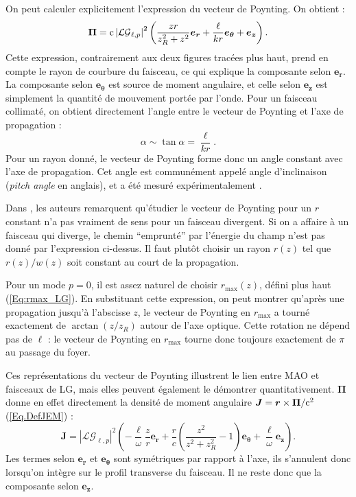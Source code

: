 On peut calculer explicitement l'expression du vecteur de Poynting. On obtient  :
\begin{equation}
\bm{\Pi} = \mathrm{c}\left|\mathcal{LG}_{\ell,p}\right|^2\left(\frac{zr}{z_R^2+z^2}\bm{e_r}+\frac{\ell}{kr}\bm{e_\theta}+\bm{e_z}\right).
\end{equation}
Cette expression, contrairement aux deux figures tracées plus haut, prend en compte le rayon de courbure du faisceau, ce qui explique la composante selon $\bm{e_r}$. La composante selon $\bm{e_\theta}$ est source de moment angulaire, et celle selon $\bm{e_z}$ est simplement la quantité de mouvement portée par l'onde. Pour un faisceau collimaté, on obtient directement l'angle entre le vecteur de Poynting et l'axe de propagation :
\begin{equation}
\alpha \sim \tan{\alpha} = \frac{\ell}{kr}.
\end{equation}
Pour un rayon donné, le vecteur de Poynting forme donc un angle constant avec l'axe de propagation. Cet angle est communément appelé angle d'inclinaison (\textit{pitch angle} en anglais), et a été mesuré expérimentalement .\par
Dans , les auteurs remarquent qu'étudier le vecteur de Poynting pour un $r$ constant n'a pas vraiment de sens pour un faisceau divergent. Si on a affaire à un faisceau qui diverge, le chemin ``emprunté'' par l'énergie du champ n'est pas donné par l'expression ci-dessus. Il faut plutôt choisir un rayon $r(z)$ tel que $r(z)/w(z)$ soit constant au court de la propagation.\par
Pour un mode $p=0$, il est assez naturel de choisir $r_\mathrm{max}(z)$, défini plus haut (\ref{Eq:rmax_LG}). En substituant cette expression, on peut montrer  qu'après une propagation jusqu'à l'abscisse $z$, le vecteur de Poynting en $r_\mathrm{max}$ a tourné exactement de $\arctan{(z/z_R)}$ autour de l'axe optique. Cette rotation ne dépend pas de $\ell$ : le vecteur de Poynting en $r_\mathrm{max}$ tourne donc toujours exactement de $\pi$ au passage du foyer. 

Ces représentations du vecteur de Poynting illustrent le lien entre MAO et faisceaux de LG, mais elles peuvent également le démontrer quantitativement. $\bm{\Pi}$ donne en effet directement la densité de moment angulaire $\bm{J} = \bm{r}\times\bm{\Pi}/\mathrm{c}^2$ (\ref{Eq.DefJEM}) :
\begin{equation}
\bm{J} = \left|\mathcal{LG}_{\ell,p}\right|^2\left(-\frac{\ell}{\omega}\frac{z}{r}\bm{e_r}+\frac{r}{c}\left(\frac{z^2}{z^2+z_R^2} -1\right)\bm{e_\theta}+\frac{\ell}{\omega}\bm{e_z}\right).
\end{equation}
Les termes selon $\bm{e_r}$ et $\bm{e_\theta}$ sont symétriques par rapport à l'axe, ils s'annulent donc lorsqu'on intègre sur le profil transverse du faisceau. Il ne reste donc que la composante selon $\bm{e_z}$. 

